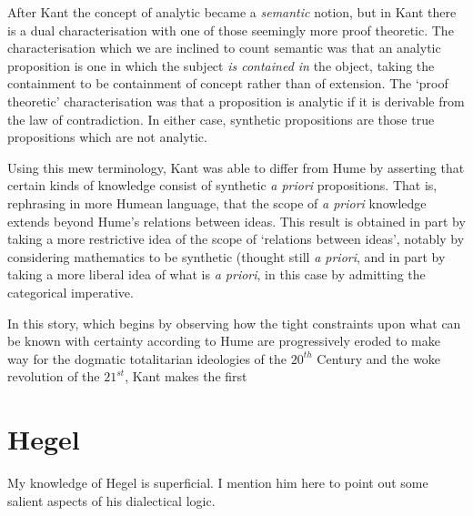 \documentclass[10pt,titlepage]{article}
\begin{document}
After Kant the concept of analytic became a \emph{semantic} notion, but in Kant there is a dual characterisation with one of those seemingly more proof theoretic.
The characterisation which we are inclined to count semantic was that an analytic proposition is one in which the subject \emph{is contained in} the object, taking the containment to be containment of concept rather than of extension.
The `proof theoretic' characterisation was that a proposition is analytic if it is derivable from the law of contradiction.
In either case, synthetic propositions are those true propositions which are not analytic.

Using this mew terminology, Kant was able to differ from Hume by asserting that certain kinds of knowledge consist of synthetic \emph{a priori} propositions.
That is, rephrasing in more Humean language, that the scope of \emph{a priori} knowledge extends beyond Hume's relations between ideas.
This result is obtained in part by taking a more restrictive idea of the scope of `relations between ideas', notably by considering mathematics to be synthetic (thought still \emph{a priori}, and in part by taking a more liberal idea of what is \emph{a priori}, in this case by admitting the categorical imperative.

In this story, which begins by observing how the tight constraints upon what can be known with certainty according to Hume are progressively eroded to make way for the dogmatic totalitarian ideologies of the $20^{th}$ Century and the woke revolution of the $21^{st}$, Kant makes the first 

\section{Hegel}

My knowledge of Hegel is superficial.
I mention him here to point out some salient aspects of his dialectical logic.



{}








\end{document}
